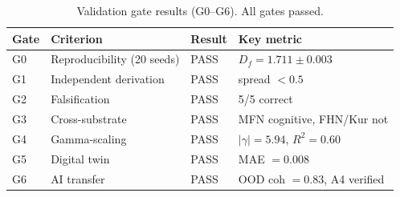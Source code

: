 \documentclass[10pt,letterpaper]{article}
\begin{document}
\begin{table}[!ht]
\centering
\caption{Validation gate results (G0--G6). All gates passed.}
\label{tab:gates}
\begin{tabular}{llll}
\toprule
Gate & Criterion & Result & Key metric \\
\midrule
G0 & Reproducibility (20 seeds) & PASS & $D_f = 1.711 \pm 0.003$ \\
G1 & Independent derivation & PASS & spread $< 0.5$ \\
G2 & Falsification & PASS & 5/5 correct \\
G3 & Cross-substrate & PASS & MFN cognitive, FHN/Kur not \\
G4 & Gamma-scaling & PASS & $|\gamma| = 5.94$, $R^2 = 0.60$ \\
G5 & Digital twin & PASS & MAE $= 0.008$ \\
G6 & AI transfer & PASS & OOD coh $= 0.83$, A4 verified \\
\bottomrule
\end{tabular}
\end{table}


\end{document}
